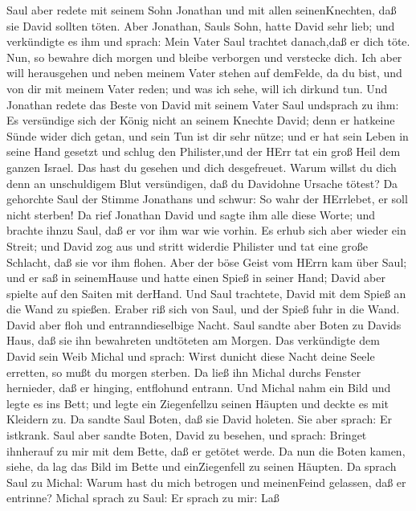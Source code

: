  Saul aber redete mit seinem Sohn Jonathan und mit allen
seinenKnechten, daß sie David sollten töten. Aber Jonathan, Sauls Sohn,
hatte David sehr lieb;  und verkündigte es ihm und sprach:
Mein Vater Saul trachtet danach,daß er dich töte. Nun, so bewahre dich
morgen und bleibe verborgen und verstecke dich.  Ich aber
will herausgehen und neben meinem Vater stehen auf demFelde, da du bist,
und von dir mit meinem Vater reden; und was ich sehe, will ich dirkund
tun.  Und Jonathan redete das Beste von David mit seinem
Vater Saul undsprach zu ihm: Es versündige sich der König nicht an
seinem Knechte David; denn er hatkeine Sünde wider dich getan, und sein
Tun ist dir sehr nütze;  und er hat sein Leben in seine Hand
gesetzt und schlug den Philister,und der HErr tat ein groß Heil dem
ganzen Israel. Das hast du gesehen und dich desgefreuet. Warum willst du
dich denn an unschuldigem Blut versündigen, daß du Davidohne Ursache
tötest?  Da gehorchte Saul der Stimme Jonathans und schwur:
So wahr der HErrlebet, er soll nicht sterben!  Da rief
Jonathan David und sagte ihm alle diese Worte; und brachte ihnzu Saul,
daß er vor ihm war wie vorhin.  Es erhub sich aber wieder
ein Streit; und David zog aus und stritt widerdie Philister und tat eine
große Schlacht, daß sie vor ihm flohen.  Aber der böse Geist
vom HErrn kam über Saul; und er saß in seinemHause und hatte einen Spieß
in seiner Hand; David aber spielte auf den Saiten mit derHand.
 Und Saul trachtete, David mit dem Spieß an die Wand zu
spießen. Eraber riß sich von Saul, und der Spieß fuhr in die Wand. David
aber floh und entranndieselbige Nacht.  Saul sandte aber
Boten zu Davids Haus, daß sie ihn bewahreten undtöteten am Morgen. Das
verkündigte dem David sein Weib Michal und sprach: Wirst dunicht diese
Nacht deine Seele erretten, so mußt du morgen sterben.  Da
ließ ihn Michal durchs Fenster hernieder, daß er hinging, entflohund
entrann.  Und Michal nahm ein Bild und legte es ins Bett;
und legte ein Ziegenfellzu seinen Häupten und deckte es mit Kleidern zu.
 Da sandte Saul Boten, daß sie David holeten. Sie aber
sprach: Er istkrank.  Saul aber sandte Boten, David zu
besehen, und sprach: Bringet ihnherauf zu mir mit dem Bette, daß er
getötet werde.  Da nun die Boten kamen, siehe, da lag das
Bild im Bette und einZiegenfell zu seinen Häupten.  Da
sprach Saul zu Michal: Warum hast du mich betrogen und meinenFeind
gelassen, daß er entrinne? Michal sprach zu Saul: Er sprach zu mir: Laß
